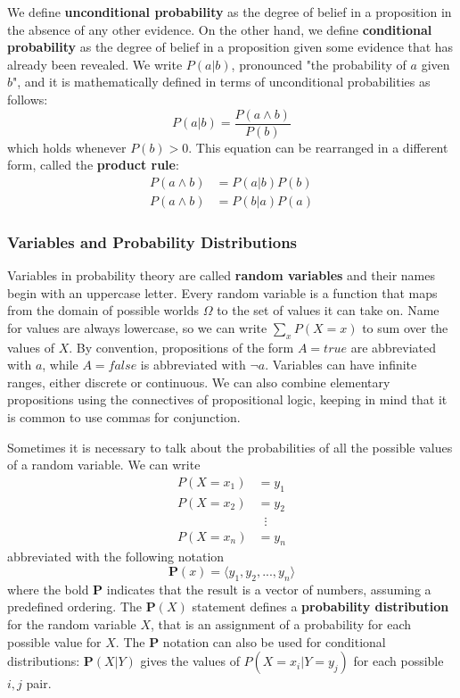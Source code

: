 \documentclass{article}
\begin{document}
We define \textbf{unconditional probability} as the degree of belief in a proposition in the absence of any other evidence. On the other hand, we define \textbf{conditional probability} as the degree of belief in a proposition given some evidence that has already been revealed. We write $P(a|b)$, pronounced "the probability of $a$ given $b$", and it is mathematically defined in terms of unconditional probabilities as follows:
$$P(a|b) = \frac{P(a\land b)}{P(b)}$$
which holds whenever $P(b)>0$. This equation can be rearranged in a different form, called the \textbf{product rule}:
\begin{align*}
    P(a\land b) &= P(a|b)P(b)\\
    P(a\land b) &= P(b|a)P(a)
\end{align*}

\subsubsection{Variables and Probability Distributions}
Variables in probability theory are called \textbf{random variables} and their names begin with an uppercase letter. Every random variable is a function that maps from the domain of possible worlds $\Omega$ to the set of values it can take on. Name for values are always lowercase, so we can write $\sum_xP(X=x)$ to sum over the values of $X$. By convention, propositions of the form $A=true$ are abbreviated with $a$, while $A=false$ is abbreviated with $\neg a$. Variables can have infinite ranges, either discrete or continuous. We can also combine elementary propositions using the connectives of propositional logic, keeping in mind that it is common to use commas for conjunction.

Sometimes it is necessary to talk about the probabilities of all the possible values of a random variable. We can write
\begin{align*}
    P(X=x_1) &= y_1 \\
    P(X=x_2) &= y_2 \\
    &\;\;\vdots     \\
    P(X=x_n) &= y_n 
\end{align*}
abbreviated with the following notation
$$\textbf{P}(x) = \langle y_1, y_2, ..., y_n\rangle$$
where the bold $\textbf{P}$ indicates that the result is a vector of numbers, assuming a predefined ordering. The $\textbf{P}(X)$ statement defines a \textbf{probability distribution} for the random variable $X$, that is an assignment of a probability for each possible value for $X$. The $\textbf{P}$ notation can also be used for conditional distributions: $\textbf{P}(X|Y)$ gives the values of $P(X=x_i|Y=y_j)$ for each possible $i, j$ pair.
\end{document}
